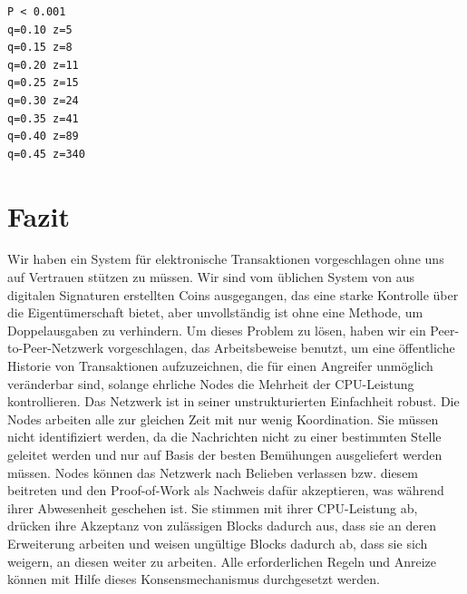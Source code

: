 \documentclass[10pt]{article}
\begin{document}
	\begin{verbatim}
P < 0.001
q=0.10 z=5
q=0.15 z=8
q=0.20 z=11
q=0.25 z=15
q=0.30 z=24
q=0.35 z=41
q=0.40 z=89
q=0.45 z=340
	\end{verbatim}
	
	\section{Fazit}
	
	Wir haben ein System für elektronische Transaktionen vorgeschlagen ohne uns auf Vertrauen stützen zu müssen. Wir sind vom üblichen System von aus digitalen Signaturen erstellten Coins ausgegangen, das eine starke Kontrolle über die Eigentümerschaft bietet, aber unvollständig ist ohne eine Methode, um Doppelausgaben zu verhindern. Um dieses Problem zu lösen, haben wir ein Peer-to-Peer-Netzwerk vorgeschlagen, das Arbeitsbeweise benutzt, um eine öffentliche Historie von Transaktionen aufzuzeichnen, die für einen Angreifer unmöglich veränderbar sind, solange ehrliche Nodes die Mehrheit der CPU-Leistung kontrollieren. Das Netzwerk ist in seiner unstrukturierten Einfachheit robust. Die Nodes arbeiten alle zur gleichen Zeit mit nur wenig Koordination. Sie müssen nicht identifiziert werden, da die Nachrichten nicht zu einer bestimmten Stelle geleitet werden und nur auf Basis der besten Bemühungen ausgeliefert werden müssen. Nodes können das Netzwerk nach Belieben verlassen bzw. diesem beitreten und den Proof-of-Work als Nachweis dafür akzeptieren, was während ihrer Abwesenheit geschehen ist. Sie stimmen mit ihrer CPU-Leistung ab, drücken ihre Akzeptanz von zulässigen Blocks dadurch aus, dass sie an deren Erweiterung arbeiten und weisen ungültige Blocks dadurch ab, dass sie sich weigern, an diesen weiter zu arbeiten. Alle erforderlichen Regeln und Anreize können mit Hilfe dieses Konsensmechanismus durchgesetzt werden.
	
	\newpage
	
\end{document}
